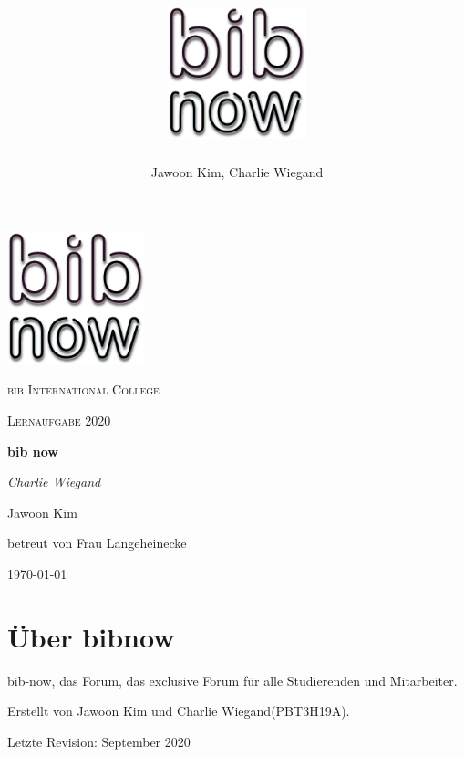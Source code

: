 \documentclass[12pt,titlepage]{article}
\title{\includegraphics[width=0.3\textwidth]{images/bibnow-logo-monotone.png}}
\author{Jawoon Kim, Charlie Wiegand}
\begin{document}
    \begin{titlepage}
    \centering
    \includegraphics[width=0.3\textwidth]{images/bibnow-logo-monotone.png}\par\vspace{1cm}
    {\scshape\LARGE bib International College\par}
    \vspace{1cm}
    {\rmfamily\scshape Lernaufgabe 2020\par}
    \vspace{1.5cm}
    {\Huge\bfseries bib now\par}
    \vspace{2cm}
    {\Large\itshape Charlie Wiegand\par Jawoon Kim\par}
    \vfill
    betreut von Frau Langeheinecke\par
    \vfill
    {\large \today\par}
    \end{titlepage}

\tableofcontents
\newpage

\listoffigures

\pagebreak


\maketitle

\vspace{2cm}


\section{Über bibnow}


bib-now, das Forum, das exclusive Forum für alle Studierenden und Mitarbeiter.

\vspace{1cm}

Erstellt von Jawoon Kim und Charlie Wiegand(PBT3H19A).

Letzte Revision: September 2020
\end{document}

